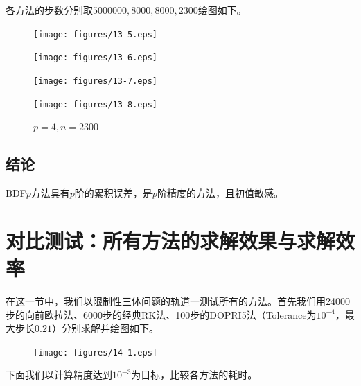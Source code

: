 \documentclass[lang=cn,10pt,bibend=bibtex]{elegantbook}
\begin{document}
各方法的步数分别取$5000000,8000,8000,2300$绘图如下。

\vspace{-1em}
\begin{figure}[H]
  \centering
  \begin{minipage}[t]{0.32\linewidth}
      \centering
      \texttt{[image: figures/13-5.eps]}
      \caption*{\small $p=1,n=5000000$}
  \end{minipage}
  \hspace{2em}
  \begin{minipage}[t]{0.32\linewidth}
      \centering
      \texttt{[image: figures/13-6.eps]}
      \caption*{\small $p=2,n=8000$}
  \end{minipage}
  \begin{minipage}[t]{0.32\linewidth}
    \centering
    \texttt{[image: figures/13-7.eps]}
    \caption*{\small $p=3,n=8000$}
\end{minipage}
\hspace{2em}
\begin{minipage}[t]{0.32\linewidth}
    \centering
    \texttt{[image: figures/13-8.eps]}
    \caption*{\small $p=4,n=2300$}
\end{minipage}
\end{figure}
\vspace{-1.5em}

\subsection{结论}

BDF$p$方法具有$p$阶的累积误差，是$p$阶精度的方法，且初值敏感。

\section{对比测试：所有方法的求解效果与求解效率}

在这一节中，我们以限制性三体问题的轨道一测试所有的方法。首先我们用24000步的向前欧拉法、6000步的经典RK法、100步的DOPRI5法（Tolerance为$10^{-4}$，最大步长$0.21$）分别求解并绘图如下。

\vspace{-1em}
\begin{figure}[H]
  \centering
  \texttt{[image: figures/14-1.eps]}
\end{figure}
\vspace{-1em}

下面我们以计算精度达到$10^{-3}$为目标，比较各方法的耗时。
\end{document}
